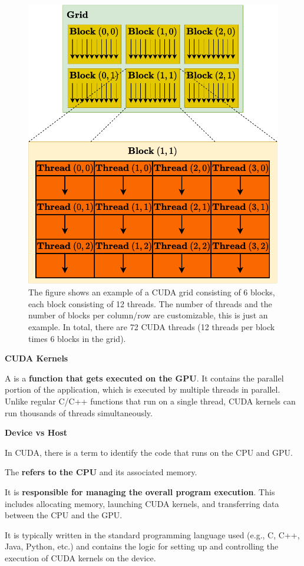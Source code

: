 \begin{figure}[!htp]
    \centering
    \includegraphics[width=.8\textwidth]{img/CUDA-blocks-grid-threads-1.pdf}
    \caption{The figure shows an example of a CUDA grid consisting of 6 blocks, each block consisting of 12 threads. The number of threads and the number of blocks per column/row are customizable, this is just an example. In total, there are 72 CUDA threads (12 threads per block times 6 blocks in the grid).}
    \label{fig: CUDA example of Grid, Blocks and Threads}
\end{figure}

\begin{flushleft}
    \textcolor{Green3}{ \textbf{CUDA Kernels}}
\end{flushleft}
A  is a \textbf{function that gets executed on the GPU}. It contains the parallel portion of the application, which is executed by multiple threads in parallel. Unlike regular C/C++ functions that run on a single thread, CUDA kernels can run thousands of threads simultaneously.

\newpage

\begin{flushleft}
    \textcolor{Green3}{ \textbf{Device vs Host}}
\end{flushleft}
In CUDA, there is a term to identify the code that runs on the CPU and GPU.
\begin{definitionbox}
    The  \textbf{refers to the CPU} and its associated memory.

    It is \textbf{responsible for managing the overall program execution}. This includes allocating memory, launching CUDA kernels, and transferring data between the CPU and the GPU.

    It is typically written in the standard programming language used (e.g., C, C++, Java, Python, etc.) and contains the logic for setting up and controlling the execution of CUDA kernels on the device.
\end{definitionbox}

